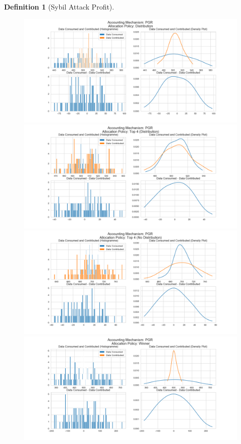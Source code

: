 \documentclass[11pt,a4paper]{article}
\theoremstyle{definition}
\newtheorem{definition}{Definition}[section]
\theoremstyle{theorem}
\theoremstyle{proposition}
\theoremstyle{corollary}
\theoremstyle{lemma}
\theoremstyle{example}
\theoremstyle{remark}
\begin{document}
\begin{definition}[Sybil Attack Profit]
\begin{figure}[H]
\begin{center}
\includegraphics[scale=0.4]{Acc_PGR_Dist.png}
\includegraphics[scale=0.4]{Acc_PGR_Top_4_Dist.png}
\includegraphics[scale=0.4]{Acc_PGR_Top_4_No_Dist.png}
\includegraphics[scale=0.4]{Acc_PGR_Winner.png}
\end{center}
\end{figure}


\end{definition}
\end{document}
